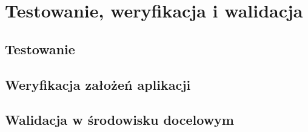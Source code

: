 \chapter{Testowanie, weryfikacja i walidacja}


\section{Testowanie}

\section{Weryfikacja założeń aplikacji}

\section{Walidacja w środowisku docelowym}